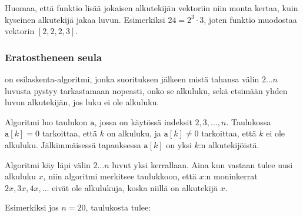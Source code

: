 Huomaa, että funktio lisää jokaisen
alkutekijän vektoriin
niin monta kertaa, kuin kyseinen
alkutekijä jakaa luvun.
Esimerkiksi $24=2^3 \cdot 3$,
joten funktio muodostaa vektorin $[2,2,2,3]$.

\subsubsection{Eratostheneen seula}


 on esilaskenta-algoritmi,
jonka suorituksen jälkeen mistä tahansa
välin $2 \ldots n$ luvusta pystyy tarkastamaan
nopeasti, onko se alkuluku,
sekä etsimään yhden luvun alkutekijän,
jos luku ei ole alkuluku.

Algoritmi luo taulukon $\texttt{a}$,
jossa on käytössä indeksit $2,3,\ldots,n$.
Taulukossa $\texttt{a}[k]=0$ tarkoittaa,
että $k$ on alkuluku,
ja $\texttt{a}[k] \neq 0$ tarkoittaa,
että $k$ ei ole alkuluku.
Jälkimmäisessä tapauksessa $\texttt{a}[k]$
on yksi $k$:n alkutekijöistä.

Algoritmi käy läpi välin
$2 \ldots n$ luvut yksi kerrallaan.
Aina kun vastaan tulee uusi alkuluku $x$,
niin algoritmi merkitsee taulukkoon, että $x$:n moninkerrat
$2x,3x,4x,\ldots$ eivät ole alkulukuja,
koska niillä on alkutekijä $x$.

Esimerkiksi jos $n=20$,
taulukosta tulee:

\begin{center}
\end{center}

